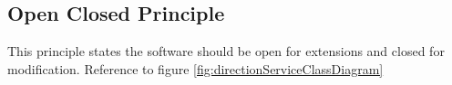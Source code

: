 \subsection{Open Closed Principle}
    This principle states the software should be open for extensions
    and closed for modification. Reference to figure \ref{fig:directionServiceClassDiagram}
    